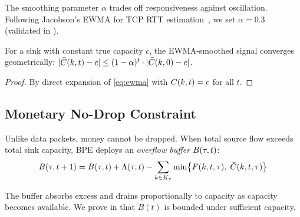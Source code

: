 The smoothing parameter $\alpha$ trades off responsiveness against oscillation.
Following Jacobson's EWMA for TCP RTT estimation~\cite{jacobson1988congestion},
we set $\alpha = 0.3$ (validated in ).

\begin{proposition}
For a sink with constant true capacity $c$, the EWMA-smoothed signal converges
geometrically:
$|\bar{C}(k, t) - c| \leq (1-\alpha)^t \cdot |\bar{C}(k, 0) - c|$.
\end{proposition}

\begin{proof}
By direct expansion of \eqref{eq:ewma} with $C(k, t) = c$ for all $t$.
\end{proof}

\subsection{Monetary No-Drop Constraint}
\label{sec:nodrop}

Unlike data packets, money cannot be dropped. When total source flow exceeds
total sink capacity, BPE deploys an \emph{overflow buffer} $B(\tau, t)$:
\begin{equation}
B(\tau, t+1) = B(\tau, t) + \Lambda(\tau, t)
    - \sum_{k \in K_\tau} \min\bigl\{F(k,t,\tau),\; \bar{C}(k,t,\tau)\bigr\}
\end{equation}

The buffer absorbs excess and drains proportionally to capacity as capacity becomes
available. We prove in  that $B(t)$ is bounded under sufficient
capacity.
